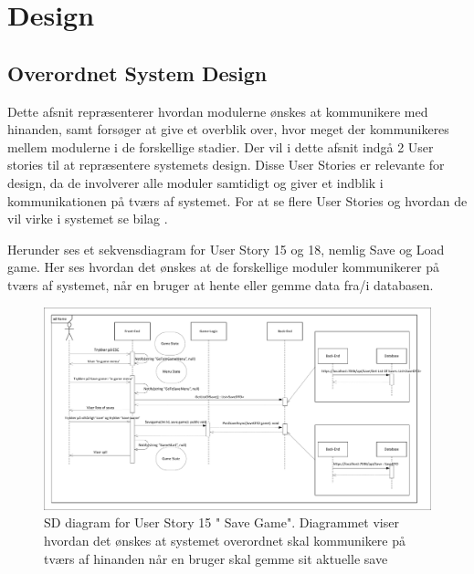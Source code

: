 \section{Design}

\subsection{Overordnet System Design}
\noindent Dette afsnit repræsenterer hvordan modulerne ønskes at kommunikere med hinanden, samt forsøger at give et overblik over, hvor meget der kommunikeres mellem modulerne i de forskellige stadier. Der vil i dette afsnit indgå 2 User stories til at repræsentere systemets design. Disse User Stories er relevante for design, da de involverer alle moduler samtidigt og giver et indblik i kommunikationen på tværs af systemet. For at se flere User Stories og hvordan de vil virke i systemet se bilag \parencite[][Section 10]{TekniskBilag}.

\noindent Herunder ses et sekvensdiagram for User Story 15 og 18, nemlig Save og Load game. Her ses hvordan det ønskes at de forskellige moduler kommunikerer på tværs af systemet, når en bruger at hente eller gemme data fra/i databasen.
\begin{figure}[H]
\centering
\includegraphics[width = \textwidth]{02-Body/Images/Arkitektur-SDSaveGame}
\caption{SD diagram for User Story 15 " Save Game". Diagrammet viser hvordan det ønskes at systemet overordnet skal kommunikere på tværs af hinanden når en bruger skal gemme sit aktuelle save}
\label{fig:Arkitektur-SD-SaveGame}
\end{figure}

